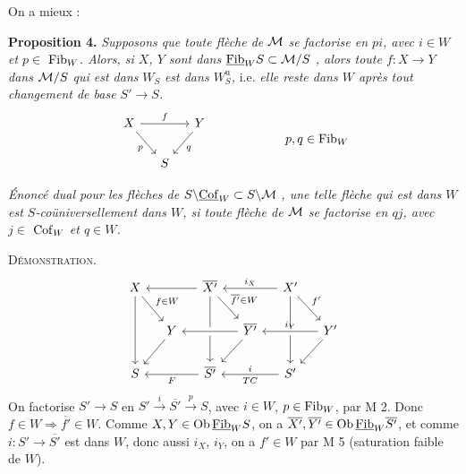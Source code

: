 On a mieux :

\textbf{Proposition 4.} \textit{Supposons que toute flèche de $\mathcal{M}$ se factorise en $pi$, avec $i\in W$ et $p\in$} $\mathrm{Fib}_W$\textit{. Alors, si $X$, $Y$ sont dans} $\underline{\mathrm{Fib}}_W S\subset\mathcal{M}/S$ \textit{, alors toute $f:X\longrightarrow Y$ dans $\mathcal{M}/S$ qui est dans} $W_S$ \textit{est dans $W^{\mathrm{u}}_S$,} i.e. \textit{elle reste dans $W$ après tout changement de base $S'\longrightarrow S$.}
\[
\begin{tikzcd}[column sep=small]
X \ar[rr,"f"] \ar[dr,"p"'] & & Y \ar[dl,"q"] \\
& S &
\end{tikzcd}
\qquad\qquad\qquad
p,q\in\Fib_W
\]

\textit{Énoncé dual pour les flèches de} $S\backslash\underline{\mathrm{Cof}}_W\subset S\backslash\mathcal{M}$ \textit{, une telle flèche qui est dans $W$ est $S$-coüniversellement dans $W$, si toute flèche de $\mathcal{M}$ se factorise en $qj$, avec $j\in$} $\mathrm{Cof}_W$ \textit{et $q\in W$.}

\textsc{Démonstration}.
\[
\begin{tikzcd}[column sep=small]
X \ar[dr,"f\in W"] \ar[dd] & & \overline{X'} \ar[ll] \ar[dr,"\overline{f'}\in W"] \ar[dd] & & X' \ar[ll,"i_X"'] \ar[dr,"f'"] \ar[dd] & \\
& Y \ar[dl] & & \overline{Y'} \ar[ll,crossing over] \ar[dl] & & Y' \ar[ll,"i_Y"',crossing over] \ar[dl] \\
S & & \overline{S'} \ar[ll,"F"] & & S' \ar[ll,"i"',"TC"] &
\end{tikzcd}
\]
On factorise $S'\longrightarrow S$ en $S'\overset{i}{\longrightarrow}\overline{S'}\overset{p}{\longrightarrow}S$, avec $i\in W$, $p\in\mathrm{Fib}_W$, par M 2. Donc $f\in W\Longrightarrow\overline{f'}\in W$. Comme $X,Y\in\mathrm{Ob}\,\underline{\mathrm{Fib}}_W S$, on a $\overline{X'},\overline{Y'}\in\mathrm{Ob}\,\underline{\mathrm{Fib}}_W\overline{S'}$, et comme $i:S'\longrightarrow\overline{S'}$ est dans $W$, donc aussi $i_X$, $i_Y$, on a $f'\in W$ par M 5 (saturation faible de $W$).

